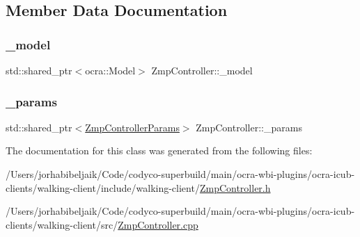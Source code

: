 \subsection{Member Data Documentation}
\hypertarget{classZmpController_ac86a58d1f870ce27c78b0f6d2294e05f}{}\label{classZmpController_ac86a58d1f870ce27c78b0f6d2294e05f} 
\subsubsection{\texorpdfstring{\+\_\+model}{\_model}}
{\footnotesize\ttfamily std\+::shared\+\_\+ptr$<$ocra\+::\+Model$>$ Zmp\+Controller\+::\+\_\+model\hspace{0.3cm}{\ttfamily [private]}}

\hypertarget{classZmpController_a59a45aafc8a49a0d49966f7ed061a022}{}\label{classZmpController_a59a45aafc8a49a0d49966f7ed061a022} 
\subsubsection{\texorpdfstring{\+\_\+params}{\_params}}
{\footnotesize\ttfamily std\+::shared\+\_\+ptr$<$\hyperlink{structZmpControllerParams}{Zmp\+Controller\+Params}$>$ Zmp\+Controller\+::\+\_\+params\hspace{0.3cm}{\ttfamily [private]}}



The documentation for this class was generated from the following files\+:\begin{DoxyCompactItemize}
\item 
/\+Users/jorhabibeljaik/\+Code/codyco-\/superbuild/main/ocra-\/wbi-\/plugins/ocra-\/icub-\/clients/walking-\/client/include/walking-\/client/\hyperlink{ZmpController_8h}{Zmp\+Controller.\+h}\item 
/\+Users/jorhabibeljaik/\+Code/codyco-\/superbuild/main/ocra-\/wbi-\/plugins/ocra-\/icub-\/clients/walking-\/client/src/\hyperlink{ZmpController_8cpp}{Zmp\+Controller.\+cpp}\end{DoxyCompactItemize}
